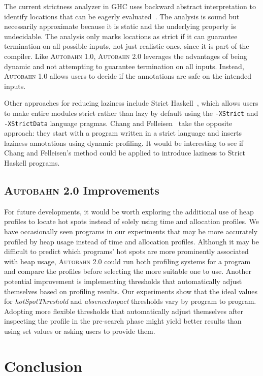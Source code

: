 \documentclass[format=sigplan, review=true, 9pt]{acmart}
\newcommand{\hotspots}[0]{hot spots}
\newcommand{\hotspotcost}[0]{\textit{hotSpotThreshold}}
\newcommand{\Ao}[0]{\textsc{Autobahn 1.0}}
\newcommand{\At}[0]{\textsc{Autobahn 2.0}}
\newcommand{\preopt}[0]{pre-search}
\newcommand{\absim}[0]{\textit{absenceImpact}}
\begin{document}
The current strictness analyzer in GHC uses backward abstract
interpretation to identify locations that can be eagerly
evaluated~\cite{Sergey14}. The analysis is sound but necessarily
approximate because it is static and the underlying property is
undecidable. The analysis only marks locations as strict if it can
guarantee termination on all possible inputs, not just realistic ones,
since it is part of the compiler.  Like \Ao{}, \At{} leverages the
advantages of being dynamic and not attempting to guarantee
termination on all inputs.  Instead, \Ao{} allows users to decide if
the annotations are safe on the intended inputs.

Other approaches for reducing laziness include Strict
Haskell~\cite{strict-haskell}, which allows users to make entire modules strict rather than
lazy by default using the \texttt{-XStrict} and \texttt{-XStrictData} language
pragmas. Chang and Felleisen~\cite{Chang14} take the opposite
approach: they start with a program written in a strict
language and inserts laziness annotations using dynamic
profiling. It would be interesting to see if Chang and Felleisen's
method could be applied to introduce laziness to Strict Haskell
programs.

\subsection{\At{} Improvements}
For future developments, it would be worth exploring the additional
use of heap profiles to locate hot spots instead of solely using time
and allocation profiles. We have occasionally seen programs in our
experiments that may be more accurately profiled by heap usage instead
of time and allocation profiles. Although it may be difficult to
predict which programs' \hotspots{} are more prominently associated
with heap usage, \At{} could run both profiling systems for a program
and compare the profiles before selecting the more suitable one to
use. Another potential improvement is implementing thresholds
that automatically adjust themselves based on profiling results. Our
experiments show that the ideal values for \hotspotcost{} and \absim{}
thresholds vary by program to program. Adopting more flexible
thresholds that automatically adjust themselves after inspecting the
profile in the \preopt{} phase might yield better results than using
set values or asking users to provide them.


\section{Conclusion}
\end{document}
